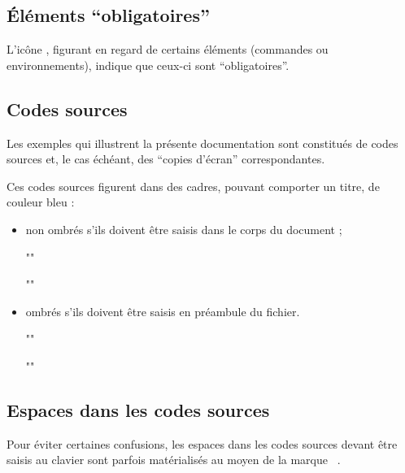 \documentclass[french,nolocaltoc]{nwejmart}
\newtheorem[style=definition]{fait}
\newtheorem[title=expérience]{experience}
\newtheorem[title-plural=anneaux]{anneau}
\newtheorem[title=idéal,title-plural=idéaux]{ideal}
\begin{document}
\subsection{Éléments \enquote{obligatoires}}
\label{sec-comm-oblig}

L'icône \mandatory{}, figurant en regard de certains éléments (commandes ou
environnements), indique que ceux-ci sont \enquote{obligatoires}.

\subsection{Codes sources}
\label{sec-codes-sources}

Les exemples qui illustrent la présente documentation sont constitués de codes
sources et, le cas échéant, des \enquote{copies d'écran} correspondantes.

Ces codes sources figurent dans des cadres, pouvant comporter un titre, de
couleur bleu :
\begin{itemize}
\item non ombrés s'ils doivent être saisis dans le corps du document ;
\begin{bodycode}
""
\end{bodycode}
\begin{bodycode}[title=\meta{titre}]
""
\end{bodycode}
\item ombrés s'ils doivent être saisis en préambule du fichier.
\begin{preamblecode}
""
\end{preamblecode}
\begin{preamblecode}[title=\meta{titre}]
""
\end{preamblecode}
\end{itemize}

\subsection{Espaces dans les codes sources}
\label{sec-espaces-dans-les}

Pour éviter certaines confusions, les espaces dans les codes sources devant
être saisis au clavier sont parfois matérialisés au moyen de la marque
\lstinline[showspaces]+ +.
\end{document}
